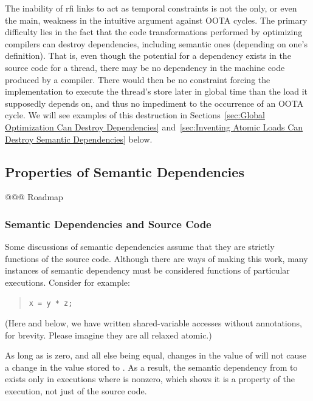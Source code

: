 \documentclass[10]{article}
\begin{document}
The inability of rfi links to act as temporal constraints is not the
only, or even the main, weakness in the intuitive argument against
OOTA cycles.
The primary difficulty lies in the fact that the code transformations
performed by optimizing compilers can destroy dependencies, including
semantic ones (depending on one's definition).
That is, even though the potential for a dependency exists in the
source code for a thread, there may be no dependency in the machine
code produced by a compiler.
There would then be no constraint forcing the implementation to execute
the thread's store later in global time than the load it supposedly depends on,
and thus no impediment to the occurrence of an OOTA cycle.
We will see examples of this destruction in
Sections~\ref{sec:Global Optimization Can Destroy Dependencies}
and~\ref{sec:Inventing Atomic Loads Can Destroy Semantic Dependencies} below.

\subsection{Properties of Semantic Dependencies}
\label{sec:Properties of Semantic Dependencies}

@@@ Roadmap

\subsubsection{Semantic Dependencies and Source Code}
\label{sec:Semantic Dependencies and Source Code}

Some discussions of semantic dependencies assume that they
are strictly functions of the source code.
Although there are ways of making this work, many instances of
semantic dependency must be considered functions of particular executions.
Consider for example:
\begin{quote}
\begin{verbatim}
x = y * z;
\end{verbatim}
\end{quote}
(Here and below, we have written shared-variable accesses without
annotations, for brevity.  Please imagine they are all relaxed atomic.)

As long as  is zero, and all else being equal, changes in the
value of  will not cause a change in the value stored to .
As a result, the semantic dependency from  to  exists only
in executions where  is nonzero,
which shows it is a property of the execution, not just of the source code.
\end{document}
